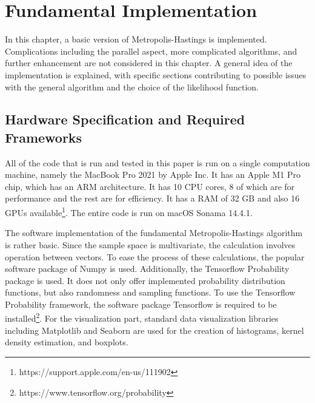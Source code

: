 \chapter{Fundamental Implementation}
In this chapter, a basic version of Metropolis-Hastings is implemented. Complications including the parallel aspect, more complicated algorithms, and further enhancement are not considered in this chapter. A general idea of the implementation is explained, with specific sections contributing to possible issues with the general algorithm and the choice of the likelihood function.

\section{Hardware Specification and Required Frameworks}
All of the code that is run and tested in this paper is run on a single computation machine, namely the MacBook Pro 2021 by Apple Inc. It has an Apple M1 Pro chip, which has an ARM architecture. It has 10 CPU cores, 8 of which are for performance and the rest are for efficiency. It has a RAM of 32 GB and also 16 GPUs available\footnote{https://support.apple.com/en-us/111902}. The entire code is run on macOS Sonama 14.4.1.

The software implementation of the fundamental Metropolis-Hastings algorithm is rather basic. Since the sample space is multivariate, the calculation involves operation between vectors. To ease the process of these calculations, the popular software package of Numpy is used.\cite{numpy} Additionally, the Tensorflow Probability package is used. It does not only offer implemented probability distribution functions, but also randomness and sampling functions.\cite{tfp} To use the Tensorflow Probability framework, the software package Tensorflow is required to be installed\footnote{https://www.tensorflow.org/probability}. For the visualization part, standard data visualization libraries including Matplotlib and Seaborn are used for the creation of histograms, kernel density estimation, and boxplots.\cite{plt}

